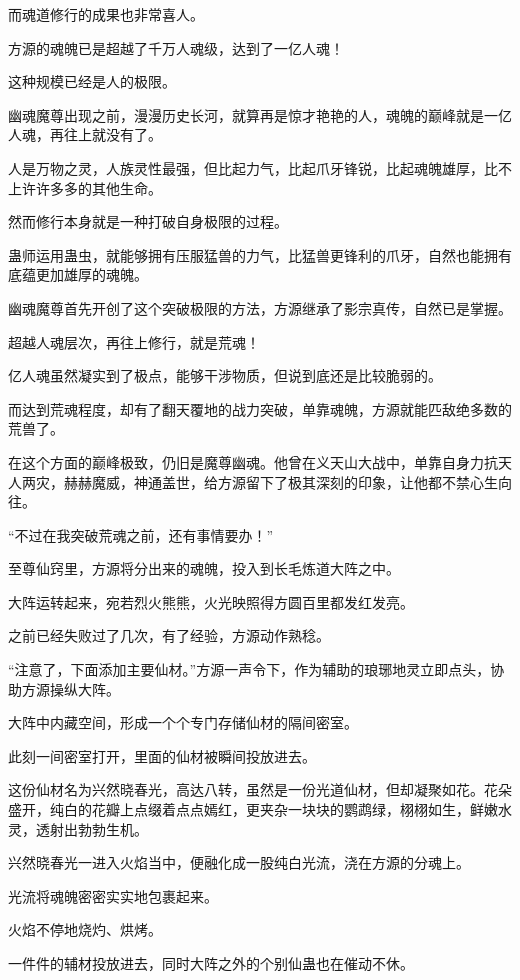 \begin{this_body}
而魂道修行的成果也非常喜人。

方源的魂魄已是超越了千万人魂级，达到了一亿人魂！

这种规模已经是人的极限。

幽魂魔尊出现之前，漫漫历史长河，就算再是惊才艳艳的人，魂魄的巅峰就是一亿人魂，再往上就没有了。

人是万物之灵，人族灵性最强，但比起力气，比起爪牙锋锐，比起魂魄雄厚，比不上许许多多的其他生命。

然而修行本身就是一种打破自身极限的过程。

蛊师运用蛊虫，就能够拥有压服猛兽的力气，比猛兽更锋利的爪牙，自然也能拥有底蕴更加雄厚的魂魄。

幽魂魔尊首先开创了这个突破极限的方法，方源继承了影宗真传，自然已是掌握。

超越人魂层次，再往上修行，就是荒魂！

亿人魂虽然凝实到了极点，能够干涉物质，但说到底还是比较脆弱的。

而达到荒魂程度，却有了翻天覆地的战力突破，单靠魂魄，方源就能匹敌绝多数的荒兽了。

在这个方面的巅峰极致，仍旧是魔尊幽魂。他曾在义天山大战中，单靠自身力抗天人两灾，赫赫魔威，神通盖世，给方源留下了极其深刻的印象，让他都不禁心生向往。

“不过在我突破荒魂之前，还有事情要办！”

至尊仙窍里，方源将分出来的魂魄，投入到长毛炼道大阵之中。

大阵运转起来，宛若烈火熊熊，火光映照得方圆百里都发红发亮。

之前已经失败过了几次，有了经验，方源动作熟稔。

“注意了，下面添加主要仙材。”方源一声令下，作为辅助的琅琊地灵立即点头，协助方源操纵大阵。

大阵中内藏空间，形成一个个专门存储仙材的隔间密室。

此刻一间密室打开，里面的仙材被瞬间投放进去。

这份仙材名为兴然晓春光，高达八转，虽然是一份光道仙材，但却凝聚如花。花朵盛开，纯白的花瓣上点缀着点点嫣红，更夹杂一块块的鹦鹉绿，栩栩如生，鲜嫩水灵，透射出勃勃生机。

兴然晓春光一进入火焰当中，便融化成一股纯白光流，浇在方源的分魂上。

光流将魂魄密密实实地包裹起来。

火焰不停地烧灼、烘烤。

一件件的辅材投放进去，同时大阵之外的个别仙蛊也在催动不休。


\end{this_body}
